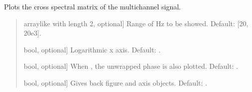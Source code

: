 \documentclass[letterpaper,10pt,english]{sphinxmanual}
\begin{document}
\begin{fulllineitems}
\begin{fulllineitems}
\label{\detokenize{classes:dsptoolbox.classes.signal_class.Signal.plot_csm}}
\pysigstartsignatures
{}
\pysigstopsignatures
\sphinxAtStartPar
Plots the cross spectral matrix of the multichannel signal.
\begin{quote}\begin{description}
\begin{description}
\sphinxlineitem{\sphinxstylestrong{range\_hz}}{[}array\sphinxhyphen{}like with length 2, optional{]}
\sphinxAtStartPar
Range of Hz to be showed. Default: {[}20, 20e3{]}.

\sphinxlineitem{\sphinxstylestrong{logx}}{[}bool, optional{]}
\sphinxAtStartPar
Logarithmic x axis. Default: .

\sphinxlineitem{\sphinxstylestrong{with\_phase}}{[}bool, optional{]}
\sphinxAtStartPar
When , the unwrapped phase is also plotted. Default: .

\sphinxlineitem{\sphinxstylestrong{returns}}{[}bool, optional{]}
\sphinxAtStartPar
Gives back figure and axis objects. Default: .

\end{description}

\begin{description}
\end{description}

\end{description}\end{quote}

\end{fulllineitems}


\end{fulllineitems}
\end{document}
